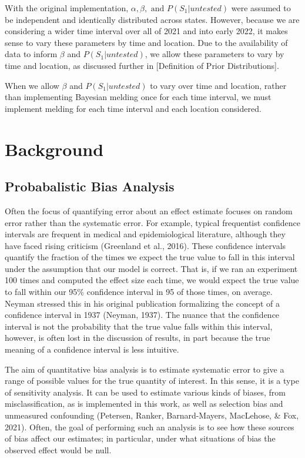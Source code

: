 \documentclass[12pt,twoside]{smiththesis}
\begin{document}
With the original implementation, \(\alpha, \beta, \text{ and } P(S_1|untested)\) were assumed to be independent and identically distributed across states. However, because we are considering a wider time interval over all of 2021 and into early 2022, it makes sense to vary these parameters by time and location. Due to the availability of data to inform \(\beta\) and \(P(S_1|untested)\), we allow these parameters to vary by time and location, as discussed further in {[}Definition of Prior Distributions{]}.

When we allow \(\beta\) and \(P(S_1|untested)\) to vary over time and location, rather than implementing Bayesian melding once for each time interval, we must implement melding for each time interval and each location considered.

\hypertarget{background}{%
\chapter{Background}\label{background}}

\hypertarget{probabalistic-bias-analysis}{%
\section{Probabalistic Bias Analysis}\label{probabalistic-bias-analysis}}

Often the focus of quantifying error about an effect estimate focuses on random error rather than the systematic error. For example, typical frequentist confidence intervals are frequent in medical and epidemiological literature, although they have faced rising criticism (Greenland et al., 2016). These confidence intervals quantify the fraction of the times we expect the true value to fall in this interval under the assumption that our model is correct. That is, if we ran an experiment 100 times and computed the effect size each time, we would expect the true value to fall within our 95\% confidence interval in 95 of those times, on average. Neyman stressed this in his original publication formalizing the concept of a confidence interval in 1937 (Neyman, 1937). The nuance that the confidence interval is not the probability that the true value falls within this interval, however, is often lost in the discussion of results, in part because the true meaning of a confidence interval is less intuitive.

The aim of quantitative bias analysis is to estimate systematic error to give a range of possible values for the true quantity of interest. In this sense, it is a type of sensitivity analysis. It can be used to estimate various kinds of biases, from misclassification, as is implemented in this work, as well as selection bias and unmeasured confounding (Petersen, Ranker, Barnard-Mayers, MacLehose, \& Fox, 2021). Often, the goal of performing such an analysis is to see how these sources of bias affect our estimates; in particular, under what situations of bias the observed effect would be null.
\end{document}
